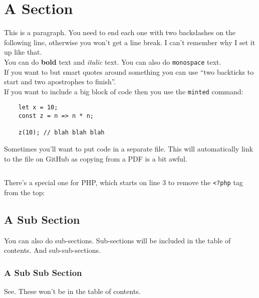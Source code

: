 \section{A Section}

This is a paragraph. You need to end each one with two backslashes on the following line, otherwise you won't get a line break. I can't remember why I set it up like that.
\\

You can do \textbf{bold} text and \textit{italic} text. You can also do \texttt{monospace} text.
\\

If you want to but smart quotes around something you can use ``two backticks to start and two apostrophes to finish''.
\\

If you want to include a big block of code then you use the \texttt{minted} command:

\begin{verbatim}
    let x = 10;
    const z = n => n * n;

    z(10); // blah blah blah
\end{verbatim}

Sometimes you'll want to put code in a separate file. This will automatically link to the file on GitHub as copying from a PDF is a bit awful.

\inputminted{js}{resources/example.js}

\pagebreak

There's a special one for PHP, which starts on line 3 to remove the \texttt{<?php} tag from the top:


\subsection{A Sub Section}

You can also do sub-sections. Sub-sections will be included in the table of contents. And sub-sub-sections.

\subsubsection{A Sub Sub Section}

See. These won't be in the table of contents.
\\

